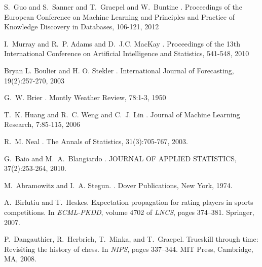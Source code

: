 \begin{thebibliography}{}

S.~Guo and S.~Sanner and T.~Graepel and W.~Buntine
.
\newblock Proceedings of the European Conference on Machine Learning and Principles
	and Practice of Knowledge Discovery in Databases, 106-121, 2012


I.~Murray and R.~P. Adams and D.~J.C. MacKay
.
\newblock Proceedings of the 13th International Conference on Artificial Intelligence
	and Statistics, 541-548, 2010

Bryan L. Boulier and H. O. Stekler
.
\newblock International Journal of Forecasting, 19(2):257-270, 2003


G.~W. Brier
.
\newblock Montly Weather Review, 78:1-3, 1950


T.~K. Huang and R.~C. Weng and C.~J. Lin
.
\newblock Journal of Machine Learning Research, 7:85-115, 2006

R.~M. Neal
.
\newblock The Annals of Statistics, 31(3):705-767, 2003.

G.~Baio and M.~A.~Blangiardo
.
\newblock JOURNAL OF APPLIED STATISTICS, 37(2):253-264, 2010.

M.~Abramowitz and I.~A. Stegun.
.
\newblock Dover Publications, New York, 1974.

A.~Birlutiu and T.~Heskes.
\newblock Expectation propagation for rating players in sports competitions.
\newblock In {\em ECML-PKDD}, volume 4702 of {\em LNCS}, pages
  374--381. Springer, 2007.

P.~Dangauthier, R.~Herbrich, T.~Minka, and T.~Graepel.
\newblock Trueskill through time: Revisiting the history of chess.
\newblock In {\em NIPS}, pages 337--344. MIT
  Press, Cambridge, MA, 2008.


\end{thebibliography}
